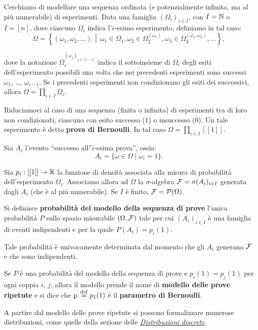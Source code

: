 \begin{multicols*}{2}
    Cerchiamo di modellare una sequenza ordinata (e potenzialmente infinita,
    ma al più numerabile)
    di esperimenti. Data una famiglia $(\Omega_i)_{i \in I}$, con $I = \mathbb{N}$ o
    $I = [n]$, dove ciascuno $\Omega_i$ indica l'$i$-esimo esperimento, definiamo
    in tal caso:
    \[ 
        \Omega = \left\{ (\omega_1, \omega_2, \ldots) \,\middle\vert\, \omega_1 \in \Omega_1, \omega_2 \in \Omega_2^{(\omega_1)}, \omega_3 \in \Omega_3^{(\omega_1, \omega_2)}, \ldots\right\},
    \]

    dove la notazione $\Omega_i^{(\omega_j)_{j \in [i-1]}}$ indica il sottoinsieme
    di $\Omega_i$ degli esiti dell'esperimento possibili una volta che nei precedenti
    esperimenti sono successi $\omega_1$, \ldots, $\omega_{i-1}$. Se i precedenti
    esperimenti non condizionano gli esiti dei successivi, allora
    $\Omega = \prod_{i \in I} \Omega_i$. \medskip


    Riduciamoci al caso di una sequenza (finita o infinita) di esperimenti tra di
    loro non condizionati, ciascuno
    con esito successo ($1$) o insuccesso ($0$). Un tale esperimento è
    detto \textbf{prova di Bernoulli}. In tal caso $\Omega = \prod_{i \in I} [[1]]$. \medskip
    
    
    Sia $A_i$ l'evento ``successo all''$i$-esima prova'', ossia:
    \[
        A_i = \{ \omega \in \Omega \mid \omega_i = 1 \}.
    \]

    Sia $p_i : [[1]] \to \mathbb{R}$ la funzione di densità associata alla misura
    di probabilità dell'esperimento $\Omega_i$. Associamo allora ad $\Omega$ la $\sigma$-algebra $\mathcal{F} = \sigma(A_i)_{i \in I}$ generata
    dagli $A_i$ (che è al più numerabile). Se $I$ è finito, $\mathcal{F} = \mathcal{P}(\Omega)$.

    \begin{definition}
        Si definisce \textbf{probabilità del modello della sequenza di prove}
        l'unica probabilità $P$ sullo spazio misurabile $(\Omega, \mathcal{F})$ tale
        per cui $(A_i)_{i \in I}$ è una famiglia di eventi indipendenti e
        per la quale $P(A_i) = p_i(1)$.
    \end{definition}

    \begin{remark}
        Tale probabilità è univocamente determinata dal momento che
        gli $A_i$ generano $\mathcal{F}$ e che sono indipendenti.
    \end{remark}

    \begin{definition}
        Se $P$ è una probabilità del modello della sequenza di prove e
        $p_i(1) = p_j(1)$ per ogni coppia $i$, $j$, allora il modello
        prende il nome di \textbf{modello delle prove ripetute} e si dice
        che $\pbern \defeq p_1(1)$ è il \textbf{parametro di Bernoulli}.
    \end{definition}

    A partire dal modello delle prove ripetute si possono formalizzare
    numerose distribuzioni, come quelle della sezione delle
    \textit{\hyperref[tab:distr_discrete]{Distribuzioni discrete}}.
\end{multicols*}